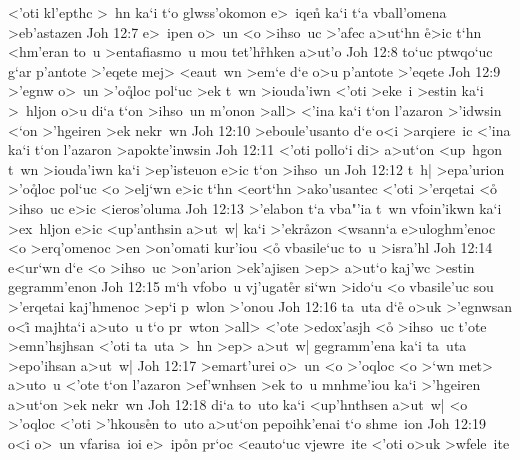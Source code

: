 <'oti
kl'epthc
>~hn
ka`i
t`o
glwss'okomon
e>~iqen\r{}
ka`i
t`a
vball'omena
>eb'astazen\bibvsend
\vs Joh 12:7
e>~ipen
o>~un
<o
>ihso~uc
>'afec
a>ut`hn
\r{e}>ic
t`hn
<hm'eran
to~u
>entafiasmo~u
mou
tet'h\r{r}hken
a>ut'o\bibvsend
\vs Joh 12:8
to`uc
ptwqo`uc
g`ar
p'antote
>'eqete
mej>
<eaut~wn
>em`e
d`e
o>u
p'antote
>'eqete\bibvsend
\vs Joh 12:9
>'egnw
o>~un
>'o\r{q}loc
pol`uc
>ek
t~wn
>iouda'iwn
<'oti
>eke~i
>estin
ka`i
>~hljon
o>u
di`a
t`on
>ihso~un
m'onon
>all>
<'ina
ka`i
t`on
l'azaron
>'idwsin
<`on
>'hgeiren
>ek
nekr~wn\bibvsend
\vs Joh 12:10
>eboule'usanto
d`e
o<i
>arqiere~ic
<'ina
ka`i
t`on
l'azaron
>apokte'inwsin\bibvsend
\vs Joh 12:11
<'oti
pollo`i
di>
a>ut`on
<up~hgon
t~wn
>iouda'iwn
ka`i
>ep'isteuon
e>ic
t`on
>ihso~un\bibvsend
\vs Joh 12:12
t~h|
>epa'urion
>'o\r{q}loc
pol`uc
<o
>elj`wn
e>ic
t`hn
<eort`hn
>ako'usantec
<'oti
>'erqetai
<o\r{}
>ihso~uc
e>ic
<ieros'oluma\bibvsend
\vs Joh 12:13
>'elabon
t`a
vba"'ia
t~wn
vfoin'ikwn
ka`i
>ex~hljon
e>ic
<up'anthsin
a>ut~w|
ka`i
>'ekr\r{a}zon
<wsann`a
e>uloghm'enoc
<o
>erq'omenoc
>en
>on'omati
kur'iou
<o\r{}
vbasile`uc
to~u
>isra'hl\bibvsend
\vs Joh 12:14
e<ur`wn
d`e
<o
>ihso~uc
>on'arion
>ek'ajisen
>ep>
a>ut`o
kaj'wc
>estin
gegramm'enon\bibvsend
\vs Joh 12:15
m`h
vfobo~u
vj'ugat\r{e}r
si`wn
>ido`u
<o
vbasile'uc
sou
>'erqetai
kaj'hmenoc
>ep`i
p~wlon
>'onou\bibvsend
\vs Joh 12:16
ta~uta
d`e\r{}
o>uk
>'egnwsan
o<i\r{}
majhta`i
a>uto~u
t`o
pr~wton
>all>
<'ote
>edox'asjh
<o\r{}
>ihso~uc
t'ote
>emn'hsjhsan
<'oti
ta~uta
>~hn
>ep>
a>ut~w|
gegramm'ena
ka`i
ta~uta
>epo'ihsan
a>ut~w|\bibvsend
\vs Joh 12:17
>emart'urei
o>~un
<o
>'oqloc
<o
>`wn
met>
a>uto~u
<'ote
t`on
l'azaron
>ef'wnhsen
>ek
to~u
mnhme'iou
ka`i
>'hgeiren
a>ut`on
>ek
nekr~wn\bibvsend
\vs Joh 12:18
di`a
to~uto
ka`i
<up'hnthsen
a>ut~w|
<o
>'oqloc
<'oti
>'hkous\r{e}n
to~uto
a>ut`on
pepoihk'enai
t`o
shme~ion\bibvsend
\vs Joh 12:19
o<i
o>~un
vfarisa~ioi
e>~ip\r{o}n
pr`oc
<eauto`uc
vjewre~ite
<'oti
o>uk
>wfele~ite
